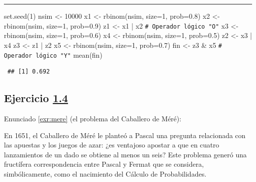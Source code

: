 \documentclass[
  10pt,
]{book}
\newenvironment{Shaded}{\begin{snugshade}}{\end{snugshade}}
\newcommand{\AttributeTok}[1]{\textcolor[rgb]{0.77,0.63,0.00}{#1}}
\newcommand{\CommentTok}[1]{\textcolor[rgb]{0.56,0.35,0.01}{\textit{#1}}}
\newcommand{\DecValTok}[1]{\textcolor[rgb]{0.00,0.00,0.81}{#1}}
\newcommand{\FloatTok}[1]{\textcolor[rgb]{0.00,0.00,0.81}{#1}}
\newcommand{\FunctionTok}[1]{\textcolor[rgb]{0.00,0.00,0.00}{#1}}
\newcommand{\NormalTok}[1]{#1}
\newcommand{\OtherTok}[1]{\textcolor[rgb]{0.56,0.35,0.01}{#1}}
\newcommand{\SpecialCharTok}[1]{\textcolor[rgb]{0.00,0.00,0.00}{#1}}
\theoremstyle{break}
\theoremstyle{nonumberplain}
\renewcommand{\CommentTok}[1]{\textcolor[rgb]{0.41,0.41,0.41}{\texttt{#1}}}
\begin{document}
\begin{center}\rule{0.5\linewidth}{0.5pt}\end{center}

\begin{Shaded}
\begin{Highlighting}[]
\FunctionTok{set.seed}\NormalTok{(}\DecValTok{1}\NormalTok{)}
\NormalTok{nsim }\OtherTok{\textless{}{-}} \DecValTok{10000}
\NormalTok{x1 }\OtherTok{\textless{}{-}} \FunctionTok{rbinom}\NormalTok{(nsim, }\AttributeTok{size=}\DecValTok{1}\NormalTok{, }\AttributeTok{prob=}\FloatTok{0.8}\NormalTok{)}
\NormalTok{x2 }\OtherTok{\textless{}{-}} \FunctionTok{rbinom}\NormalTok{(nsim, }\AttributeTok{size=}\DecValTok{1}\NormalTok{, }\AttributeTok{prob=}\FloatTok{0.9}\NormalTok{)}
\NormalTok{z1 }\OtherTok{\textless{}{-}}\NormalTok{ x1 }\SpecialCharTok{|}\NormalTok{ x2   }\CommentTok{\# Operador lógico "O"}
\NormalTok{x3 }\OtherTok{\textless{}{-}} \FunctionTok{rbinom}\NormalTok{(nsim, }\AttributeTok{size=}\DecValTok{1}\NormalTok{, }\AttributeTok{prob=}\FloatTok{0.6}\NormalTok{)}
\NormalTok{x4 }\OtherTok{\textless{}{-}} \FunctionTok{rbinom}\NormalTok{(nsim, }\AttributeTok{size=}\DecValTok{1}\NormalTok{, }\AttributeTok{prob=}\FloatTok{0.5}\NormalTok{)}
\NormalTok{z2 }\OtherTok{\textless{}{-}}\NormalTok{ x3 }\SpecialCharTok{|}\NormalTok{ x4}
\NormalTok{z3 }\OtherTok{\textless{}{-}}\NormalTok{ z1 }\SpecialCharTok{|}\NormalTok{ z2}
\NormalTok{x5 }\OtherTok{\textless{}{-}} \FunctionTok{rbinom}\NormalTok{(nsim, }\AttributeTok{size=}\DecValTok{1}\NormalTok{, }\AttributeTok{prob=}\FloatTok{0.7}\NormalTok{)}
\NormalTok{fin }\OtherTok{\textless{}{-}}\NormalTok{ z3 }\SpecialCharTok{\&}\NormalTok{ x5  }\CommentTok{\# Operador lógico "Y"}
\FunctionTok{mean}\NormalTok{(fin)}
\end{Highlighting}
\end{Shaded}

\begin{verbatim}
 ## [1] 0.692
\end{verbatim}

\hypertarget{sol-mere}{%
\subsection{\texorpdfstring{Ejercicio \href{ejercicios.html\#exr:mere}{1.4}}{Ejercicio 1.4}}\label{sol-mere}}

Enunciado \ref{exr:mere} (el problema del Caballero de Méré):

En 1651, el Caballero de Méré le planteó a Pascal una pregunta
relacionada con las apuestas y los juegos de azar: ¿es ventajoso
apostar a que en cuatro lanzamientos de un dado se obtiene al menos
un seis? Este problema generó una fructífera correspondencia entre
Pascal y Fermat que se considera, simbólicamente, como el nacimiento
del Cálculo de Probabilidades.
\end{document}
